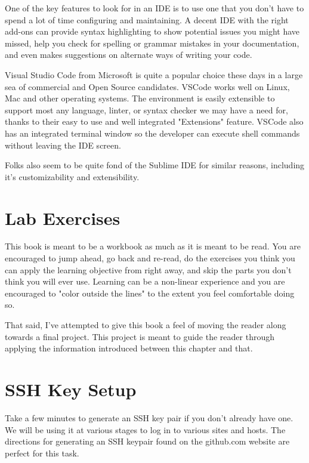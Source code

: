\justify
One of the key features to look for in an IDE is to use one that you
don't have to spend a lot of time configuring and maintaining. A decent
IDE with the right add-ons can provide syntax highlighting to show
potential issues you might have missed, help you check for spelling or
grammar mistakes in your documentation, and even makes suggestions on
alternate ways of writing your code.

\justify
Visual Studio Code
from Microsoft is quite a popular choice these days in a large sea of
commercial and Open Source candidates. VSCode works well on Linux, Mac
and other operating systems. The environment is easily extensible to
support most any language, linter, or syntax checker we may have a need
for, thanks to their easy to use and well integrated "Extensions"
feature. VSCode also has an integrated terminal window so the developer
can execute shell commands without leaving the IDE screen.

\justify
Folks also seem to be quite fond of the Sublime 
IDE for similar reasons, including it's customizability and extensibility.

\section{Lab Exercises}
\justify
This book is meant to be a workbook as much as it is meant to be read. You are encouraged to jump ahead,
go back and re-read, do the exercises you think you can apply the learning objective from right away, 
and skip the parts you don't think you will ever use. Learning can be a non-linear experience and you 
are encouraged to "color outside the lines" to the extent you feel comfortable doing so.

\justify
That said, I've attempted to give this book a feel of moving the reader along towards a final project. 
This project is meant to guide the reader through applying the information introduced between this chapter 
and that.

\section{SSH Key Setup}
\justify
Take a few minutes to generate an SSH key pair if you don't already have
one. We will be using it at various stages to log in to various sites
and hosts. The directions for generating an SSH keypair found on the
github.com website
are perfect for this task.

